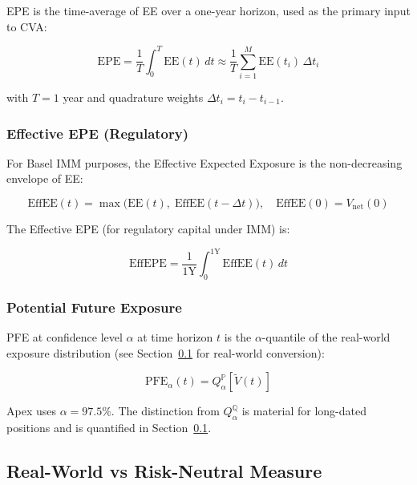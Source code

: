 \documentclass[11pt,a4paper]{article}
\begin{document}
EPE is the time-average of EE over a one-year horizon, used as the primary
input to CVA:

\begin{equation}
  \text{EPE} = \frac{1}{T}\int_0^T \text{EE}(t)\,dt
    \approx \frac{1}{T}\sum_{i=1}^{M} \text{EE}(t_i)\,\Delta t_i
  \label{eq:epe}
\end{equation}

with $T = 1$ year and quadrature weights $\Delta t_i = t_i - t_{i-1}$.

\subsubsection{Effective EPE (Regulatory)}

For Basel IMM purposes, the Effective Expected Exposure is the non-decreasing
envelope of EE:

\begin{equation}
  \text{EffEE}(t) = \max\!\bigl(\text{EE}(t),\; \text{EffEE}(t - \Delta t)\bigr),
  \quad \text{EffEE}(0) = V_{\text{net}}(0)
  \label{eq:eff_ee}
\end{equation}

The Effective EPE (for regulatory capital under IMM) is:

\begin{equation}
  \text{EffEPE} = \frac{1}{1\text{Y}} \int_0^{1\text{Y}} \text{EffEE}(t)\, dt
  \label{eq:eff_epe}
\end{equation}

\subsubsection{Potential Future Exposure}

PFE at confidence level $\alpha$ at time horizon $t$ is the $\alpha$-quantile
of the real-world exposure distribution (see Section~\ref{sec:measure} for
real-world conversion):

\begin{equation}
  \text{PFE}_\alpha(t) = Q_\alpha^{\mathbb{P}}\!\left[\tilde{V}(t)\right]
  \label{eq:pfe}
\end{equation}

Apex uses $\alpha = 97.5\%$. The distinction from
$Q_\alpha^{\mathbb{Q}}$ is material for long-dated positions and is
quantified in Section~\ref{sec:measure}.

\subsection{Real-World vs Risk-Neutral Measure}
\label{sec:measure}
\end{document}
